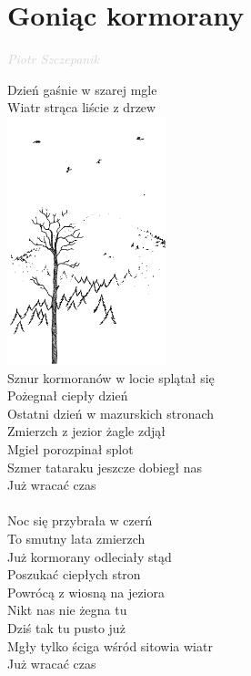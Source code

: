 \documentclass[a5paper, 10pt]{book}
\begin{document}
\section{Goniąc kormorany}\textcolor{lightgray}{\textit{Piotr Szczepanik}}\vspace*{2mm}\\
\begin{minipage}[t]{0.78\textwidth}
Dzień gaśnie w szarej mgle\\
Wiatr strąca liście z drzew\\
\includegraphics[height=72mm,right]{images/goniac_kormorany.png}\vspace*{-73mm}\\
Sznur kormoranów w locie splątał się\\
Pożegnał ciepły dzień\\
Ostatni dzień w mazurskich stronach\\
\hspace*{5mm}Zmierzch z jezior żagle zdjął\\
\hspace*{5mm}Mgieł porozpinał splot\\
\hspace*{5mm}Szmer tataraku jeszcze dobiegł nas\\
\hspace*{5mm}Już wracać czas\\
\\
Noc się przybrała w czerń\\
To smutny lata zmierzch\\
Już kormorany odleciały stąd\\
Poszukać ciepłych stron\\
Powrócą z wiosną na jeziora\\
\hspace*{5mm}Nikt nas nie żegna tu\\
\hspace*{5mm}Dziś tak tu pusto już\\
\hspace*{5mm}Mgły tylko ściga wśród sitowia wiatr\\
\hspace*{5mm}Już wracać czas\\
\end{minipage}
\end{document}
